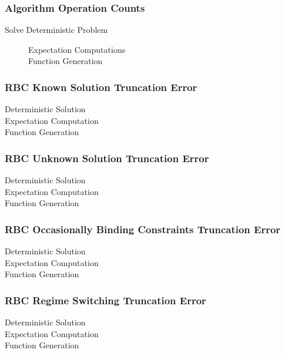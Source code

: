 \documentclass[tikz]{beamer}
\begin{document}
\begin{frame}
  \frametitle{Algorithm Operation Counts}
  \begin{description}
  \item[Solve Deterministic Problem]
    \begin{description}
    \item[Expectation Computations] 
    \item[Function Generation] 
    \end{description}
  \end{description}
\end{frame}



\begin{frame}
  \frametitle{RBC Known Solution Truncation Error }
  \begin{description}
  \item[Deterministic Solution] 
  \item[Expectation Computation] 
\item[Function Generation]
  \end{description}

\end{frame}


\begin{frame}
  \frametitle{RBC Unknown Solution Truncation Error }
  \begin{description}
  \item[Deterministic Solution] 
  \item[Expectation Computation] 
\item[Function Generation]
  \end{description}

\end{frame}


\begin{frame}
  \frametitle{RBC Occasionally Binding Constraints Truncation Error }
  \begin{description}
  \item[Deterministic Solution] 
  \item[Expectation Computation] 
\item[Function Generation]
  \end{description}

\end{frame}


\begin{frame}
  \frametitle{RBC Regime Switching Truncation Error }
  \begin{description}
  \item[Deterministic Solution] 
  \item[Expectation Computation] 
\item[Function Generation]
  \end{description}

\end{frame}
\end{document}
